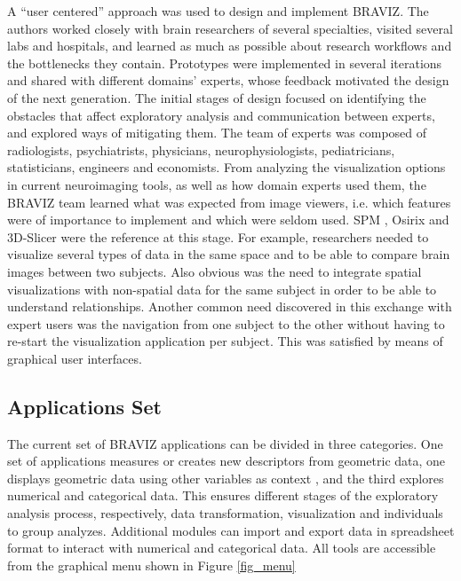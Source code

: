 \documentclass[twocolumn]{svjour3} %
\begin{document}
A ``user centered'' approach \cite{fernandez_user-centered_2013}\cite{wassink_applying_2009} was used to design and implement BRAVIZ. The authors worked closely with brain researchers of several specialties, visited several labs and hospitals, and learned as much as possible about research workflows and the bottlenecks they contain. Prototypes were implemented in several iterations and shared with different domains’ experts, whose feedback motivated the design of the next generation.
The initial stages of design focused on identifying the obstacles that affect exploratory analysis and communication between experts, and explored ways of mitigating them. The team of experts was composed of radiologists, psychiatrists, physicians, neurophysiologists, pediatricians, statisticians, engineers and economists.
From analyzing the visualization options in current neuroimaging tools, as well as how domain experts used them, the BRAVIZ team learned what was expected from image viewers, i.e. which features were of importance to implement and which were seldom used. SPM \cite{friston_statistical_2007}, Osirix \cite{rosset_osirix:_2004} and 3D-Slicer \cite{fedorov_3d_2012} were the reference at this stage. For example, researchers needed to visualize several types of data in the same space and to be able to compare brain images between two subjects. Also obvious was the need to integrate spatial visualizations with non-spatial data for the same subject in order to be able to understand relationships. Another common need discovered in this exchange with expert users was the navigation from one subject to the other without having to re-start the visualization application per subject. This was satisfied by means of graphical user interfaces.


\subsection{Applications Set}


The current set of BRAVIZ applications can be divided in three categories. One set of applications measures or creates new descriptors from geometric data, one displays geometric data using other variables as context , and the third explores numerical and categorical data. This ensures different stages of the exploratory analysis process, respectively, data transformation, visualization and individuals to group analyzes. Additional modules can import and export data in spreadsheet format to interact with numerical and categorical data. All tools  are accessible from the graphical menu shown in Figure \ref{fig_menu}
\end{document}
